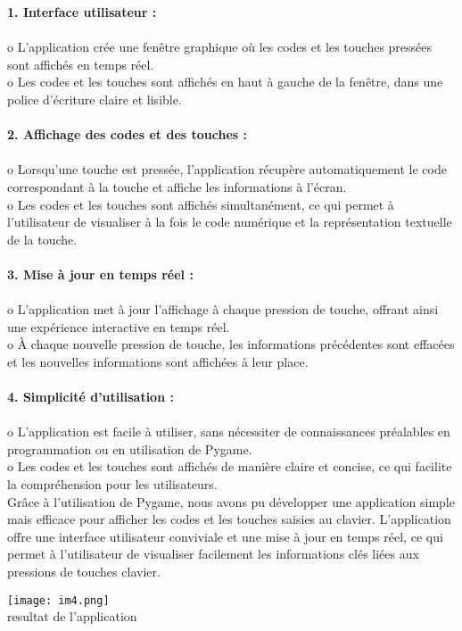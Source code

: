 \documentclass[a4paper, 12px]{article}
\begin{document}
{\bfseries 1.	Interface utilisateur :}\\
\\
o	L'application crée une fenêtre graphique où les codes et les touches pressées sont affichés en temps réel.\\
o	Les codes et les touches sont affichés en haut à gauche de la fenêtre, dans une police d'écriture claire et lisible.\\
\\
{\bfseries 2.	Affichage des codes et des touches :} \\
\\
o	Lorsqu'une touche est pressée, l'application récupère automatiquement le code correspondant à la touche et affiche les informations à l'écran.\\
o	Les codes et les touches sont affichés simultanément, ce qui permet à l'utilisateur de visualiser à la fois le code numérique et la représentation textuelle de la touche.\\
\\
{\bfseries 3.	Mise à jour en temps réel :}\\
\\
o	L'application met à jour l'affichage à chaque pression de touche, offrant ainsi une expérience interactive en temps réel.\\
o	À chaque nouvelle pression de touche, les informations précédentes sont effacées et les nouvelles informations sont affichées à leur place.\\
\\
{\bfseries 4.	Simplicité d'utilisation :}\\
\\
o	L'application est facile à utiliser, sans nécessiter de connaissances préalables en programmation ou en utilisation de Pygame.\\
o	Les codes et les touches sont affichés de manière claire et concise, ce qui facilite la compréhension pour les utilisateurs.\\

Grâce à l'utilisation de Pygame, nous avons pu développer une application simple mais efficace pour afficher les codes et les touches saisies au clavier. L'application offre une interface utilisateur conviviale et une mise à jour en temps réel, ce qui permet à l'utilisateur de visualiser facilement les informations clés liées aux pressions de touches clavier.
\\
\begin{center}
\texttt{[image: im4.png]}\\
resultat de l'application
\end{center}
\end{document}
